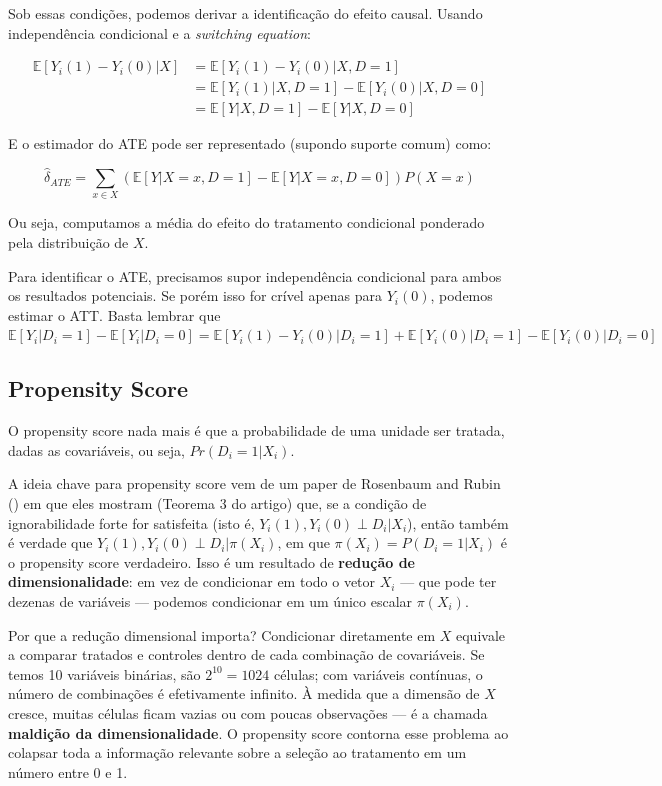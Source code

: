 \documentclass[
]{article}
\begin{document}
Sob essas condições, podemos derivar a identificação do efeito causal. Usando independência condicional e a \emph{switching equation}:

\begin{align}
   \mathbb{E}[Y_i(1)-Y_i(0)|X] & = \mathbb{E}[Y_i(1) - Y_i(0) | X, D=1] \\
            & = \mathbb{E}[Y_i(1)| X, D=1] - \mathbb{E}[Y_i(0)| X,D=0] \\
            & = \mathbb{E}[Y| X, D=1] - \mathbb{E}[Y| X, D=0]
\end{align}

E o estimador do ATE pode ser representado (supondo suporte comum) como:

\[\widehat{\delta}_{ATE} = \sum_{x\in X}{(\mathbb{E}[Y| X=x, D=1] - \mathbb{E}[Y| X=x, D=0])P(X=x)}\]

Ou seja, computamos a média do efeito do tratamento condicional ponderado pela distribuição de \(X\).

Para identificar o ATE, precisamos supor independência condicional para ambos os resultados potenciais. Se porém isso for crível apenas para \(Y_i(0)\), podemos estimar o ATT. Basta lembrar que \(\mathbb{E}[Y_i|D_i=1] - \mathbb{E}[Y_i|D_i=0] =  \mathbb{E}[Y_i(1) - Y_i(0)|D_i=1] + \mathbb{E}[Y_i(0)|D_i=1] - \mathbb{E}[Y_i(0)|D_i=0]\)

\subsection{Propensity Score}\label{propensity-score}

O propensity score nada mais é que a probabilidade de uma unidade ser tratada, dadas as covariáveis, ou seja, \(Pr(D_i = 1| X_i)\).

A ideia chave para propensity score vem de um paper de Rosenbaum and Rubin () em que eles mostram (Teorema 3 do artigo) que, se a condição de ignorabilidade forte for satisfeita (isto é, \(Y_i(1), Y_i(0) \perp D_i|X_i\)), então também é verdade que \(Y_i(1), Y_i(0) \perp D_i|\pi(X_i)\), em que \(\pi(X_i) = P(D_i = 1|X_i)\) é o propensity score verdadeiro. Isso é um resultado de \textbf{redução de dimensionalidade}: em vez de condicionar em todo o vetor \(X_i\) --- que pode ter dezenas de variáveis --- podemos condicionar em um único escalar \(\pi(X_i)\).

Por que a redução dimensional importa? Condicionar diretamente em \(X\) equivale a comparar tratados e controles dentro de cada combinação de covariáveis. Se temos 10 variáveis binárias, são \(2^{10} = 1024\) células; com variáveis contínuas, o número de combinações é efetivamente infinito. À medida que a dimensão de \(X\) cresce, muitas células ficam vazias ou com poucas observações --- é a chamada \textbf{maldição da dimensionalidade}. O propensity score contorna esse problema ao colapsar toda a informação relevante sobre a seleção ao tratamento em um número entre 0 e 1.
\end{document}
